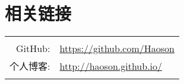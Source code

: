 \documentclass[10pt]{article} %
\begin{document}
\begin{minipage}[t]{0.32\textwidth}
\section{相关链接} 

\begin{tabular}{rl}
& \\
{GitHub:} &  \url{https://github.com/Haoson}\\
{个人博客:} & \url{http://haoson.github.io/}\\
& \\
\end{tabular}\\[10pt]


\end{minipage} %
\end{document}
